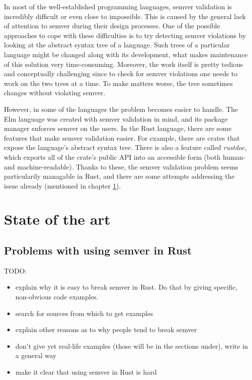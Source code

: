 \documentclass[licencjacka,en]{pracamgr}
\begin{document}
In most of the well-established programming languages, semver validation is incredibly difficult
or even close to impossible. This is caused by the general lack of attention to semver during
their design processes. One of the possible approaches to cope with these difficulties is to try
detecting semver violations by looking at the abstract syntax tree of a language. Such trees of
a particular language might be changed along with its development, what makes maintenance of this
solution very time-consuming. Moreover, the work itself is pretty tedious and conceptually
challenging since to check for semver violations one needs to work on the two trees at a time.
To make matters worse, the tree sometimes changes without violating semver.

However, in some of the languages the problem becomes easier to handle. The Elm language was
created with semver validation in mind, and its package manager enforces semver on the users.
In the Rust language, there are some features that make semver validation easier. For example,
there are crates that expose the language's abstract syntax tree. There is also a feature called
\textit{rustdoc}, which exports all of the crate's public API into an accessible form (both human-
and machine-readable). Thanks to these, the semver validation problem seems particularily managable
in Rust, and there are some attempts addressing the issue already (mentioned in chapter
\ref{r:chapter_stateoftheart}).



\chapter{State of the art}\label{r:chapter_stateoftheart}

\section{Problems with using semver in Rust}\label{r:section_usageofsemver}

TODO:
\begin{itemize}
	\item explain why it is easy to break semver in Rust.
		Do that by giving specific, non-obvious code examples.
	\item search for sources from which to get examples
	\item explain other reasons as to why people tend to break semver
	\item don't give yet real-life examples (those will be in the sections under),
		write in a general way
	\item make it clear that using semver in Rust is hard
\end{itemize}
\end{document}
